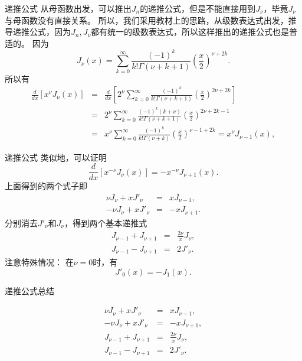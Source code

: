 \documentclass[11pt]{beamer}
\begin{document}
\begin{frame}{递推公式}
从母函数出发，可以推出$J_n$的递推公式，但是不能直接用到$J_\nu$，毕竟$J_\nu$与母函数没有直接关系。
所以，我们采用教材上的思路，从级数表达式出发，推导递推公式，因为$J_n, J_\nu$都有统一的级数表达式，所以这样推出的递推公式也是普适的。
因为
\begin{equation}
J_\nu(x) = \sum^\infty_{k=0} \frac{(-1)^k}{k!\Gamma(\nu+k+1)} (\frac{x}{2})^{\nu+2k}.
\end{equation}
所以有
\begin{eqnarray}
\frac{d}{dx}[ x^\nu J_\nu (x) ] &=& \frac{d}{dx}[ 2^\nu \sum^\infty_{k=0} \frac{(-1)^k}{k!\Gamma(\nu+k+1)} (\frac{x}{2})^{2\nu+2k} ] \nonumber\\
&=& 2^\nu \sum^\infty_{k=0} \frac{(-1)^k (k+\nu)}{k!\Gamma(\nu+k+1)} (\frac{x}{2})^{2\nu+2k-1}  \nonumber\\
&=& x^\nu \sum^\infty_{k=0} \frac{(-1)^k }{k!\Gamma(\nu+k)} (\frac{x}{2})^{\nu-1+2k}
= x^\nu J_{\nu-1}(x),
\end{eqnarray}

\end{frame}

\begin{frame}{递推公式}
类似地，可以证明
\begin{equation}
\frac{d}{dx}[ x^{-\nu} J_\nu(x) ] = - x^{-\nu} J_{\nu+1}(x).
\end{equation}
上面得到的两个式子即
\begin{eqnarray}
\nu J_\nu + xJ'_\nu &=& x J_{\nu-1}, \\
- \nu J_\nu + x J'_\nu &=& - x J_{\nu+1}.
\end{eqnarray}
分别消去$J'_\nu$和$J_\nu$，得到两个基本递推式
\begin{eqnarray}
J_{\nu-1} + J_{\nu+1} &=& \frac{2\nu}{x} J_\nu, 
\label{eqn:Bessel-recursion1}
\\
J_{\nu-1} - J_{\nu+1} &=& 2 J'_\nu.
\label{eqn:Bessel-resursion2}
\end{eqnarray}
注意特殊情况：
在$\nu = 0$时，有
\begin{equation}
J'_0 (x) = - J_1(x).
\end{equation}
\end{frame}

\begin{frame}{递推公式总结}

\begin{eqnarray}
\nu J_\nu + xJ'_\nu &=& x J_{\nu-1}, \\
- \nu J_\nu + x J'_\nu &=& - x J_{\nu+1}, \\
J_{\nu-1} + J_{\nu+1} &=& \frac{2\nu}{x} J_\nu, 
\\
J_{\nu-1} - J_{\nu+1} &=& 2 J'_\nu.
\end{eqnarray}

\end{frame}
\end{document}
